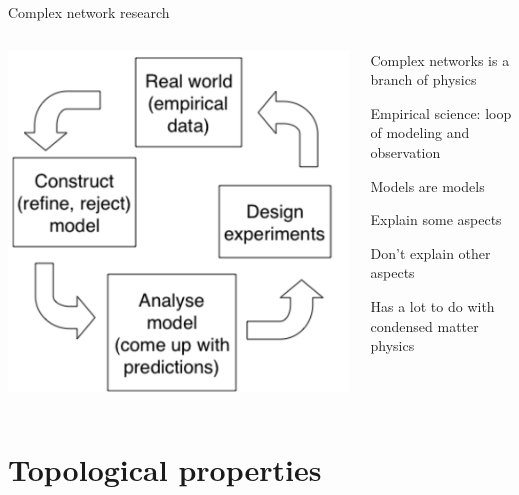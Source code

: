 \begin{frame}{Complex network research}

\begin{columns}
\begin{column}{0.4\textwidth}
\includegraphics[width=\textwidth]{figs/08/experimental}
\end{column}
\begin{column}{0.6\textwidth}
\BIL
\item Complex networks is a branch of physics
\item Empirical science: loop of modeling and observation
\item Models are models
\BI
\item Explain some aspects
\item Don't explain other aspects
\EI
\item Has a lot to do with condensed matter physics
\EIL
\end{column}
\end{columns}


\end{frame}

\section{Topological properties}

